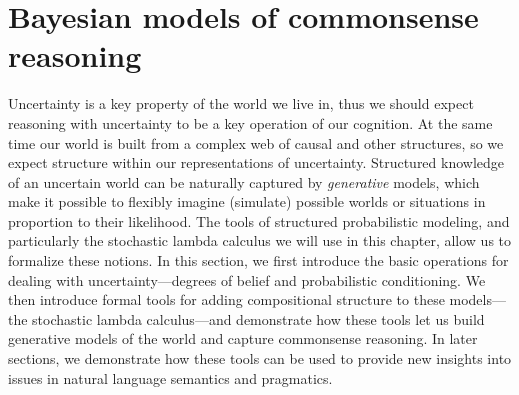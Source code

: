 \documentclass[12pt]{article}
\begin{document}
\section{Bayesian models of commonsense reasoning}

  
  
  
  
%  
  
 

Uncertainty is a key property of the world we live in, thus we should expect reasoning with uncertainty to be a key operation of our cognition. 
At the same time our world is built from a complex web of causal and other structures, so we expect structure within our representations of uncertainty. 
Structured knowledge of an uncertain world can be naturally captured by \emph{generative} models, which make it possible to flexibly imagine (simulate) possible worlds or situations in proportion to their likelihood. 
The tools of structured probabilistic modeling, and particularly the stochastic lambda calculus we will use in this chapter, allow us to formalize these notions. 
In this section, we first introduce the basic operations for dealing with uncertainty---degrees of belief and probabilistic conditioning. 
We then introduce formal tools for adding compositional structure to these models---the stochastic lambda calculus---and demonstrate how these tools let us build generative models of the world and capture commonsense reasoning. 
In later sections, we demonstrate how these tools can be used to provide new insights into issues in natural language semantics and pragmatics.
\end{document}
